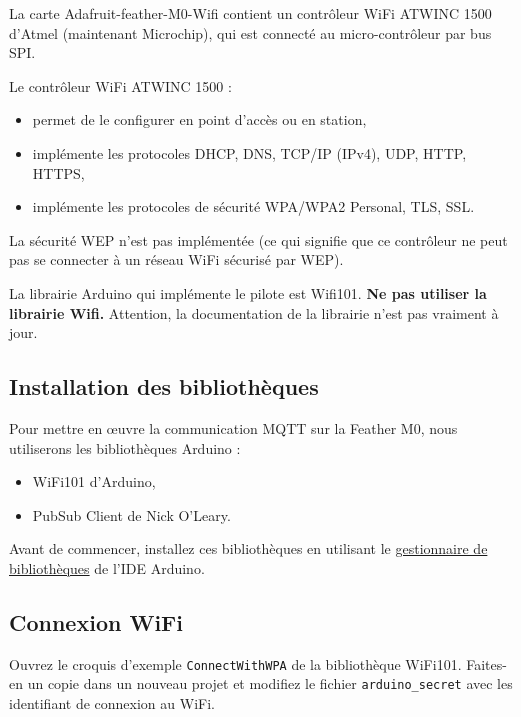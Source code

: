 \documentclass[11pt]{paper}
\begin{document}
La carte Adafruit-feather-M0-Wifi contient un contrôleur WiFi \og ATWINC 1500 \fg d'Atmel (maintenant Microchip), qui est connecté au micro-contrôleur par bus SPI.

Le contrôleur WiFi ATWINC 1500 :
\begin{itemize}
	\item permet de le configurer en point d'accès ou en station,
	\item implémente les protocoles DHCP, DNS, TCP/IP (IPv4), UDP, HTTP, HTTPS,
	\item implémente les protocoles de sécurité WPA/WPA2 Personal, TLS, SSL.
\end{itemize}

La sécurité WEP n'est pas implémentée (ce qui signifie que ce contrôleur ne peut pas se connecter à un réseau WiFi sécurisé par WEP).

La librairie Arduino qui implémente le pilote est Wifi101. {\bf Ne pas utiliser la librairie Wifi.} Attention, la documentation de la librairie n'est pas vraiment à jour.

\subsection{Installation des bibliothèques}

Pour mettre en œuvre la communication MQTT sur la Feather M0, nous utiliserons les bibliothèques Arduino :
\begin{itemize}
	\item WiFi101 d'Arduino,
	\item PubSub Client de Nick O'Leary.\\
\end{itemize}

Avant de commencer, installez ces bibliothèques en utilisant le \href{https://docs.arduino.cc/software/ide-v1/tutorials/installing-libraries#toc3}{gestionnaire de bibliothèques} de l'IDE Arduino.

\subsection{Connexion WiFi}

Ouvrez le croquis d'exemple {\tt ConnectWithWPA} de la bibliothèque WiFi101. Faites-en un copie dans un nouveau projet et modifiez le fichier {\tt arduino\_secret} avec les identifiant de connexion au WiFi.
\end{document}
